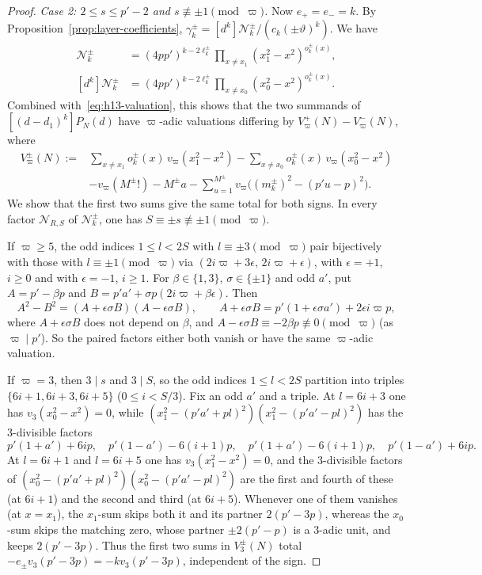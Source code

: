 \documentclass[twoside,10pt]{article}
\numberwithin{equation}{section}
\theoremstyle{slbody}
\theoremstyle{definition}
\theoremstyle{remark}
\begin{document}
\begin{proof}
\emph{Case 2: \(2\leq s\leq p'-2\) and \(s\not\equiv\pm1\pmod\varpi\).}  Now
\(e_+=e_-=k\).  By Proposition~\ref{prop:layer-coefficients},
\(\gamma^\pm_k=[d^k]\mathcal N^\pm_k/(c_k(\pm\vartheta)^k)\).  We have
\begin{align*}
 [(d-d_1)^k]\mathcal N^\pm_k&=(4pp')^{k-2\ell^\pm_k}\prod_{x\neq x_1}(x_1^2-x^2)^{o^\pm_k(x)},\\
 [d^k]\mathcal N^\pm_k&=(4pp')^{k-2\ell^\pm_k}\prod_{x\neq x_0}(x_0^2-x^2)^{o^\pm_k(x)}.
\end{align*}
Combined with~\eqref{eq:h13-valuation}, this shows that the two summands of
\([(d-d_1)^k]P_N(d)\) have \(\varpi\)-adic valuations differing by
\(V_\varpi^+(N)-V_\varpi^-(N)\), where
\[
 \begin{aligned}
 V_\varpi^\pm(N):={}&\sum_{x\neq x_1}o^\pm_k(x)\,v_\varpi(x_1^2-x^2)
 -\sum_{x\neq x_0}o^\pm_k(x)\,v_\varpi(x_0^2-x^2)\\
 &-v_\varpi(M^\pm!)-M^\pm a-\sum_{u=1}^{M^\pm}v_\varpi\bigl((m^\pm_k)^2-(p'u-p)^2\bigr).
 \end{aligned}
\]
We show that the first two sums give the same total for both signs.  In
every factor \({\mathcal N}_{R,S}\) of \(\mathcal N^\pm_k\), one has
\(S\equiv\pm s\not\equiv\pm1\pmod\varpi\).

If \(\varpi\geq5\), the odd indices \(1\leq l<2S\) with
\(l\equiv\pm3\pmod\varpi\) pair bijectively with those with
\(l\equiv\pm1\pmod\varpi\) via \((2i\varpi+3\epsilon,\,2i\varpi+\epsilon)\), with
\(\epsilon=+1\), \(i\geq0\) and with \(\epsilon=-1\), \(i\geq1\).  For
\(\beta\in\{1,3\}\), \(\sigma\in\{\pm1\}\) and odd \(a'\), put
\(A=p'-\beta p\) and \(B=p'a'+\sigma p(2i\varpi+\beta\epsilon)\).  Then
\[
 A^2-B^2=(A+\epsilon\sigma B)(A-\epsilon\sigma B),\qquad
 A+\epsilon\sigma B=p'(1+\epsilon\sigma a')+2\epsilon i\varpi p,
\]
where \(A+\epsilon\sigma B\) does not depend on \(\beta\), and
\(A-\epsilon\sigma B\equiv-2\beta p\not\equiv0\pmod\varpi\) (as \(\varpi\mid p'\)).
So the paired factors either both vanish or have the same \(\varpi\)-adic
valuation.

If \(\varpi=3\), then \(3\mid s\) and \(3\mid S\), so the odd indices
\(1\leq l<2S\) partition into triples \(\{6i+1,6i+3,6i+5\}\)
(\(0\leq i<S/3\)).  Fix an odd \(a'\) and a triple.  At \(l=6i+3\) one has
\(v_3(x_0^2-x^2)=0\), while \((x_1^2-(p'a'+pl)^2)(x_1^2-(p'a'-pl)^2)\) has the
\(3\)-divisible factors
\[
 p'(1+a')+6ip,\quad p'(1-a')-6(i+1)p,\quad p'(1+a')-6(i+1)p,\quad p'(1-a')+6ip.
\]
At \(l=6i+1\) and \(l=6i+5\) one has \(v_3(x_1^2-x^2)=0\), and the
\(3\)-divisible factors of \((x_0^2-(p'a'+pl)^2)(x_0^2-(p'a'-pl)^2)\) are the
first and fourth of these (at \(6i+1\)) and the second and third (at
\(6i+5\)).  Whenever one of them vanishes (at \(x=x_1\)), the \(x_1\)-sum skips
both it and its partner \(2(p'-3p)\), whereas the \(x_0\)-sum skips the
matching zero, whose partner \(\pm2(p'-p)\) is a \(3\)-adic unit, and keeps
\(2(p'-3p)\).  Thus the first two sums in \(V_3^\pm(N)\) total
\(-e_\pm v_3(p'-3p)=-kv_3(p'-3p)\), independent of the sign.


\end{proof}
\end{document}
